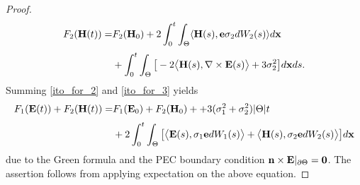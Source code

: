 \documentclass[10pt,a4paper]{amsart}
\begin{document}
\begin{proof}
\begin{equation}
			\begin{split}
				F_2({\bf H}(t))=&F_2({\bf H}_0)+2\int_0^t\int_\Theta\langle {\bf H}(s),{\bf{e}}\sigma_{2}dW_2(s)\rangle{\rm d}{\bf x}\\[1mm]
				&+\int_0^t\int_\Theta\big[-2\big\langle{\bf H}(s),\nabla\times {\bf E}(s)\big\rangle+3\sigma_{2}^2\big]{\rm d}{\bf x}{\rm d}s.
			\end{split}
		\end{equation}
		Summing \eqref{ito_for_2} and \eqref{ito_for_3} yields
		\begin{equation*}\label{ito_for_23}
			\begin{split}
				F_1({\bf E}(t))+F_2({\bf H}(t))=&F_1({\bf E}_0)+F_2({\bf H}_0)++3(\sigma_1^2+\sigma_2^2)|\Theta|t\\[1mm]
				&+2\int_0^t\int_\Theta\big[\big\langle {\bf E}(s),\sigma_{1}{\bf{e}}{\rm d}W_1(s)\big\rangle +\big\langle {\bf H}(s),\sigma_{2}{\bf{e}}{\rm d}W_2(s)\big\rangle\big]{\rm d}{\bf x}
			\end{split}
		\end{equation*}
		due to the Green formula and the PEC boundary condition ${\bf n}\times{\bf E}|_{\partial \Theta}={\bf 0}$. The assertion follows from applying expectation on the above equation.
\end{proof}
\end{document}
